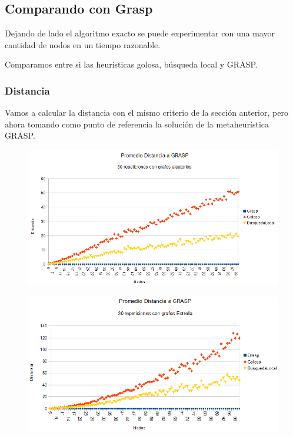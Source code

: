 \quad



\subsection{Comparando con Grasp}

\quad Dejando de lado el algoritmo exacto se puede experimentar con una mayor cantidad de nodos en un tiempo razonable.

\quad Comparamos entre si las heuristicas golosa, búsqueda local y GRASP.

\quad 

\subsubsection{Distancia}

\quad Vamos a calcular la distancia con el mismo criterio de la sección anterior, pero ahora tomando como punto de referencia la solución de la metaheurística GRASP.

\begin{figure}[H]
	\centering
	\includegraphics[scale=0.6]{distancia-Grasp-Azar.png}
\end{figure}

\begin{figure}[H]
	\centering
	\includegraphics[scale=0.6]{distancia-Grasp-Star.png}
\end{figure}

